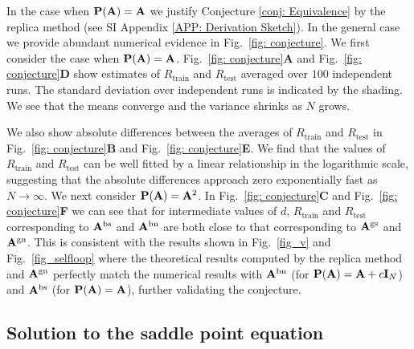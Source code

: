 \documentclass[9pt,twocolumn]{pnas-new}
\begin{document}
In the case when $\mathbf{P}(\mathbf{A}) = \mathbf{A}$ we justify Conjecture \ref{conj: Equivalence} by the replica method (see SI Appendix \ref{APP: Derivation Sketch}). In the general case we provide abundant numerical evidence in Fig.~\ref{fig: conjecture}. We first consider the case when $\mathbf{P}(\mathbf{A})=\mathbf{A}$. Fig.~\ref{fig: conjecture}\textbf{\textsf{A}} and Fig.~\ref{fig: conjecture}\textbf{\textsf{D}} show estimates of $R_\text{train}$ and $R_\text{test}$ averaged over $100$ independent runs. The standard deviation over independent runs is indicated by the shading. We see that the means converge and the variance shrinks as $N$ grows. 

We also show absolute differences between the averages of $R_\text{train}$ and $R_\text{test}$ in Fig.~\ref{fig: conjecture}\textbf{\textsf{B}} and  Fig.~\ref{fig: conjecture}\textbf{\textsf{E}}. We find that the values of $R_\text{train}$ and $R_\text{test}$ can be well fitted by a linear relationship in the logarithmic scale, suggesting that the absolute differences approach zero exponentially fast as $N \to \infty$. We next consider $\mathbf{P}(\mathbf{A})=\mathbf{A}^2$. In Fig.~\ref{fig: conjecture}\textbf{\textsf{C}} and Fig.~\ref{fig: conjecture}\textbf{\textsf{F}} we can see that for intermediate values of $d$, $R_\text{train}$ and $R_\text{test}$ corresponding to $\mathbf{A}^{\text{bs}}$ and $\mathbf{A}^{\text{bn}}$ are both close to that corresponding to $\mathbf{A}^{\text{gs}}$ and $\mathbf{A}^{\text{gn}}$. This is consistent with the results shown in Fig.~\ref{fig_v} and Fig.~\ref{fig_selfloop} where the theoretical results computed by the replica method and $\mathbf{A}^{\text{gn}}$ perfectly match the numerical results with $\mathbf{A}^{\text{bn}}$ (for $\mathbf{P}(\mathbf{A})=\mathbf{A}+c\mathbf{I}_N$) and $\mathbf{A}^{\text{bs}}$ (for $\mathbf{P}(\mathbf{A})=\mathbf{A}$), further validating the conjecture.


\subsection*{Solution to the saddle point equation}
\end{document}
